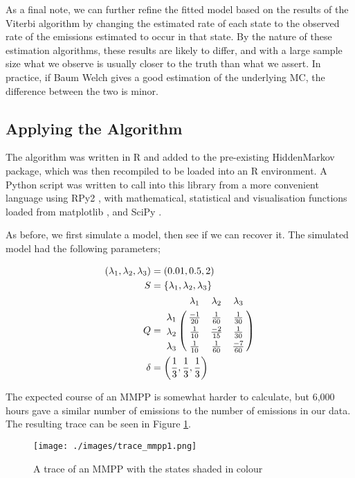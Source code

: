 As a final note, we can further refine the fitted model based on the results of the Viterbi algorithm by changing the estimated rate of each state to the observed rate of the emissions estimated to occur in that state. By the nature of these estimation algorithms, these results are likely to differ, and with a large sample size what we observe is usually closer to the truth than what we assert. In practice, if Baum Welch gives a good estimation of the underlying MC, the difference between the two is minor.

\subsection{Applying the Algorithm}

The algorithm was written in R and added to the pre-existing HiddenMarkov \cite{hiddenmarkov}
package, which was then recompiled to be loaded into an R environment. A Python script was written to call into this library from a more convenient language using RPy2 \cite{rpy}, with mathematical, statistical and visualisation functions loaded from matplotlib \cite{matplotlib}, and SciPy \cite{scipy}.

As before, we first simulate a model, then see if we can recover it. The simulated model had the following parameters;

\begin{align*}
(\lambda_1,\lambda_2,\lambda_3) &= (0.01,0.5,2)\\
S &= \{\lambda_1,\lambda_2,\lambda_3\}\\
Q &= \bordermatrix{      & \lambda_1 & \lambda_2 & \lambda_3\cr
                \lambda_1 & \frac{-1}{20} & \frac{1}{60}  & \frac{1}{30} \cr
                \lambda_2 & \frac{1}{10}  & \frac{-2}{15} & \frac{1}{30} \cr
                \lambda_3 & \frac{1}{10}  & \frac{1}{60}  & \frac{-7}{60}\cr
			}\\
\delta &= \left(\frac{1}{3},\frac{1}{3},\frac{1}{3}\right)
\end{align*}

The expected course of an MMPP is somewhat harder to calculate, but 6,000 hours gave a similar number of emissions to the number of emissions in our data. The resulting trace can be seen in Figure \ref{trace_mmpp1}.

\clearpage
\begin{figure}[h!]
\texttt{[image: ./images/trace\_mmpp1.png]}
\caption{A trace of an MMPP with the states shaded in colour \protect\footnotemark }
\label{trace_mmpp1}
\end{figure}

